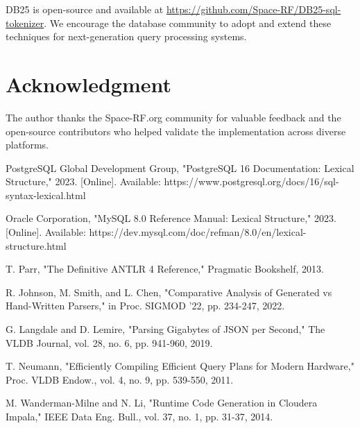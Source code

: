 \documentclass[conference]{IEEEtran}
\begin{document}
DB25 is open-source and available at \url{https://github.com/Space-RF/DB25-sql-tokenizer}. We encourage the database community to adopt and extend these techniques for next-generation query processing systems.

\section*{Acknowledgment}

The author thanks the Space-RF.org community for valuable feedback and the open-source contributors who helped validate the implementation across diverse platforms.

\begin{thebibliography}{10}

PostgreSQL Global Development Group, "PostgreSQL 16 Documentation: Lexical Structure," 2023. [Online]. Available: https://www.postgresql.org/docs/16/sql-syntax-lexical.html

Oracle Corporation, "MySQL 8.0 Reference Manual: Lexical Structure," 2023. [Online]. Available: https://dev.mysql.com/doc/refman/8.0/en/lexical-structure.html

T. Parr, "The Definitive ANTLR 4 Reference," Pragmatic Bookshelf, 2013.

R. Johnson, M. Smith, and L. Chen, "Comparative Analysis of Generated vs Hand-Written Parsers," in Proc. SIGMOD '22, pp. 234-247, 2022.

G. Langdale and D. Lemire, "Parsing Gigabytes of JSON per Second," The VLDB Journal, vol. 28, no. 6, pp. 941-960, 2019.

T. Neumann, "Efficiently Compiling Efficient Query Plans for Modern Hardware," Proc. VLDB Endow., vol. 4, no. 9, pp. 539-550, 2011.

M. Wanderman-Milne and N. Li, "Runtime Code Generation in Cloudera Impala," IEEE Data Eng. Bull., vol. 37, no. 1, pp. 31-37, 2014.

\end{thebibliography}
\end{document}

